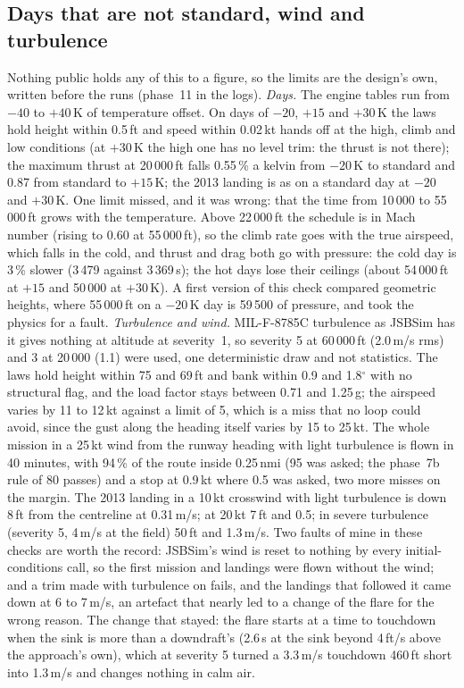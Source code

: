 \documentclass[10pt,a4paper,twocolumn]{article}
\begin{document}
\subsection{Days that are not standard, wind and turbulence}\label{sec:offdesign}
Nothing public holds any of this to a figure, so the limits are the design's own, written before the runs (phase~11 in the logs). \emph{Days.} The engine tables
run from $-40$ to $+40$\,K of temperature offset. On days of $-20$, $+15$ and $+30$\,K the laws hold height within 0.5\,ft and speed within 0.02\,kt hands off at the
high, climb and low conditions (at $+30$\,K the high one has no level trim: the thrust is not there); the maximum thrust at 20\,000\,ft falls 0.55\,\% a kelvin
from $-20$\,K to standard and 0.87 from standard to $+15$\,K; the 2013 landing is as on a standard day at $-20$ and $+30$\,K. One limit missed, and it was wrong: that
the time from 10\,000 to 55\,000\,ft grows with the temperature. Above 22\,000\,ft the schedule is in Mach number (rising to 0.60 at 55\,000\,ft), so the climb rate goes with the true airspeed,
which falls in the cold, and thrust and drag both go with pressure: the cold day is 3\,\% slower (3\,479 against 3\,369\,s); the hot days lose their ceilings
(about 54\,000\,ft at $+15$ and 50\,000 at $+30$\,K). A first version of this check compared geometric heights, where 55\,000\,ft on a $-20$\,K day is 59\,500 of
pressure, and took the physics for a fault. \emph{Turbulence and wind.} MIL-F-8785C turbulence as JSBSim has it gives nothing at altitude at severity~1, so severity 5
at 60\,000\,ft (2.0\,m/s rms) and 3 at 20\,000 (1.1) were used, one deterministic draw and not statistics. The laws hold height within 75 and 69\,ft and bank within
0.9 and 1.8$^\circ$ with no structural flag, and the load factor stays between 0.71 and 1.25\,g; the airspeed varies by 11 to 12\,kt against a limit of 5, which is a
miss that no loop could avoid, since the gust along the heading itself varies by 15 to 25\,kt. The whole mission in a 25\,kt wind from the runway heading with light
turbulence is flown in 40 minutes, with 94\,\% of the route inside 0.25\,nmi (95 was asked; the phase~7b rule of 80 passes) and a stop at 0.9\,kt where 0.5 was asked, two more
misses on the margin. The 2013 landing in a 10\,kt crosswind with light turbulence is down 8\,ft from the centreline at 0.31\,m/s; at 20\,kt 7\,ft and 0.5; in severe turbulence
(severity 5, 4\,m/s at the field) 50\,ft and 1.3\,m/s. Two faults of mine in these checks are worth the record: JSBSim's wind is reset to nothing by every initial-conditions
call, so the first mission and landings were flown without the wind; and a trim made with turbulence on fails, and the landings that followed it came down at 6 to 7\,m/s, an
artefact that nearly led to a change of the flare for the wrong reason. The change that stayed: the flare starts at a time to touchdown when the sink is more than a
downdraft's (2.6\,s at the sink beyond 4\,ft/s above the approach's own), which at severity 5 turned a 3.3\,m/s touchdown 460\,ft short into 1.3\,m/s and changes nothing in calm air.
\end{document}
